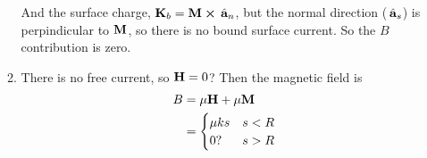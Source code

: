 \documentclass{homework}
\begin{document}
\begin{enumerate}
\begin{enumerate}
			And the surface charge, $\boldsymbol{\mathrm{K}}_b  = \boldsymbol{\mathrm{M}} \cross \thinspace\hat{ \mathbf{a}}_{n}$, but the normal direction ($\thinspace\hat{ \mathbf{a}}_{s}$) is perpindicular to $\boldsymbol{\mathrm{M}}$, so there is no bound surface current. So the $B$ contribution is zero.
			
			\item There is no free current, so $\boldsymbol{\mathrm{H}} = 0$? Then the magnetic field is \begin{align*}
				B & = \mu\boldsymbol{\mathrm{H}} + \mu\boldsymbol{\mathrm{M}} \\
					& = \begin{cases}
						\mu k s & s < R \\
						0? & s > R
					\end{cases}
			\end{align*}
		\end{enumerate}
	

\end{enumerate}
\end{document}

